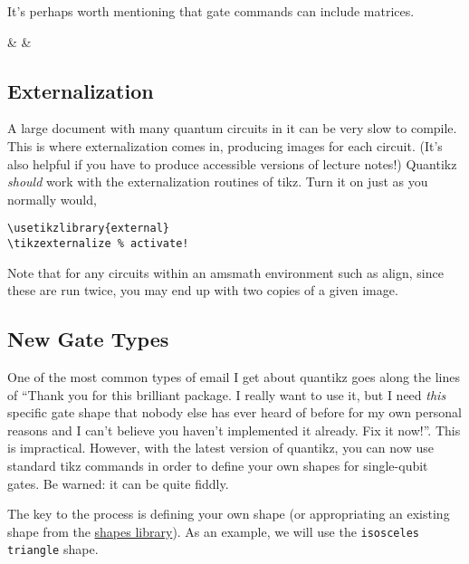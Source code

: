 \documentclass[aps,pra,10pt,nofootinbib]{revtex4-2}
\begin{document}
It's perhaps worth mentioning that gate commands can include matrices.
\begin{Code}
\begin{quantikz}
 &  & \rstick{\ket{+}}
\end{quantikz}
\end{Code}


\subsection{Externalization}

A large document with many quantum circuits in it can be very slow to compile. This is where externalization comes in, producing images for each circuit. (It's also helpful if you have to produce accessible versions of lecture notes!) Quantikz \emph{should} work with the externalization routines of tikz. Turn it on just as you normally would,
\begin{FullCode}
\begin{lstlisting}
\usetikzlibrary{external}
\tikzexternalize % activate!
\end{lstlisting}
\end{FullCode}
Note that for any circuits within an amsmath environment such as align, since these are run twice, you may end up with two copies of a given image.


\subsection{New Gate Types}

One of the most common types of email I get about quantikz goes along the lines of ``Thank you for this brilliant package. I really want to use it, but I need \emph{this} specific gate shape that nobody else has ever heard of before for my own personal reasons and I can't believe you haven't implemented it already. Fix it now!''. This is impractical. However, with the latest version of quantikz, you can now use standard tikz commands in order to define your own shapes for single-qubit gates. Be warned: it can be quite fiddly.

The key to the process is defining your own shape (or appropriating an existing shape from the \href{https://tikz.dev/library-shapes}{shapes library}). As an example, we will use the \texttt{isosceles triangle} shape.
\end{document}
